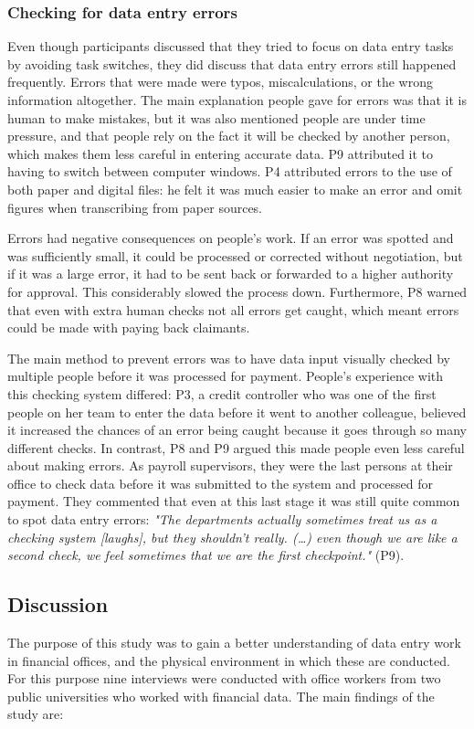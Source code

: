\subsubsection{Checking for data entry errors}
Even though participants discussed that they tried to focus on data entry tasks by avoiding task switches, they did discuss that data entry errors still happened frequently. Errors that were made were typos, miscalculations, or the wrong information altogether. The main explanation people gave for errors was that it is human to make mistakes, but it was also mentioned people are under time pressure, and that people rely on the fact it will be checked by another person, which makes them less careful in entering accurate data. P9 attributed it to having to switch between computer windows. P4 attributed errors to the use of both paper and digital files: he felt it was much easier to make an error and omit figures when transcribing from paper sources.

Errors had negative consequences on people's work. If an error was spotted and was sufficiently small, it could be processed or corrected without negotiation, but if it was a large error, it had to be sent back or forwarded to a higher authority for approval. This considerably slowed the process down. Furthermore, P8 warned that even with extra human checks not all errors get caught, which meant errors could be made with paying back claimants.

The main method to prevent errors was to have data input visually checked by multiple people before it was processed for payment. People's experience with this checking system differed: P3, a credit controller who was one of the first people on her team to enter the data before it went to another colleague, believed it increased the chances of an error being caught because it goes through so many different checks. In contrast, P8 and P9 argued this made people even less careful about making errors. As payroll supervisors, they were the last persons at their office to check data before it was submitted to the system and processed for payment. They commented that even at this last stage it was still quite common to spot data entry errors: \textit{"The departments actually sometimes treat us as a checking system [laughs], but they shouldn't really. (…) even though we are like a second check, we feel sometimes that we are the first checkpoint."} (P9).

\subsection{Discussion}
The purpose of this study was to gain a better understanding of data entry work in financial offices, and the physical environment in which these are conducted. For this purpose nine interviews were conducted with office workers from two public universities who worked with financial data. The main findings of the study are: 

